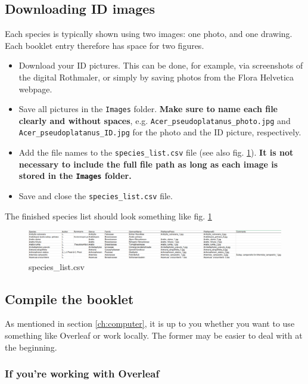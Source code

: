 \documentclass[a4paper,12pt,twoside]{article}
\begin{document}
        \subsection{Downloading ID images} \label{ch:filenamephoto}
            Each species is typically shown using two images: one photo, and one drawing. Each booklet entry therefore has space for two figures.
            \begin{itemize}
                \item Download your ID pictures. This can be done, for example, via screenshots of the digital Rothmaler, or simply by saving photos from the Flora Helvetica webpage.
                \item Save all pictures in the \texttt{Images} folder. \textbf{Make sure to name each file clearly and without spaces}, e.g. \texttt{Acer\_pseudoplatanus\_photo.jpg} and \texttt{Acer\_pseudoplatanus\_ID.jpg} for the photo and the ID picture, respectively.
                \item Add the file names to the \texttt{species\_list.csv} file (see also fig. \ref{fig:example}). \textbf{It is not necessary to include the full file path as long as each image is stored in the \texttt{Images} folder.}
                \item Save and close the \texttt{species\_list.csv} file. 
            \end{itemize}
        The finished species list should look something like fig. \ref{fig:example}
                
            \begin{figure}[h]
                \centering
                \includegraphics[width=1\linewidth]{example.png}
                \caption{species\_list.csv}
                \label{fig:example}
            \end{figure}
            
        \subsection{Compile the booklet}
            As mentioned in section \ref{ch:computer}, it is up to you whether you want to use something like Overleaf or work locally. The former may be easier to deal with at the beginning. 
            
        \subsubsection{If you're working with Overleaf} 
            
\end{document}
